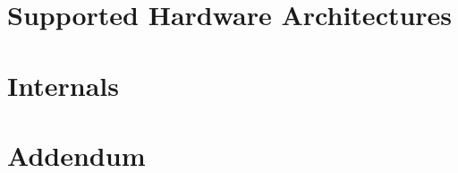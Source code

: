 \part{Supported Hardware Architectures}













\part{\ecs{} Internals}






\appendix
{}
\part*{Addendum}






\concludebook
